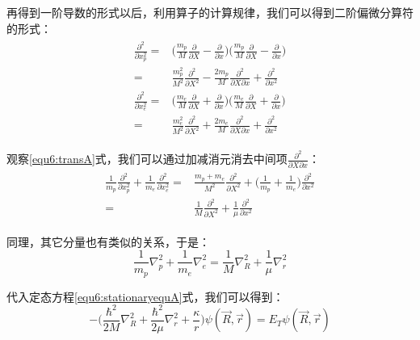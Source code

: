             再得到一阶导数的形式以后，利用算子的计算规律，我们可以得到二阶偏微分算符的形式：
            \begin{align}\label{equ6:transA}
                \begin{split}
                    \frac{\partial^2}{\partial x_p^2}=&\Big(\frac{m_p}{M}\frac{\partial }{\partial X}-\frac{\partial}{\partial x}\Big)\Big(\frac{m_p}{M}\frac{\partial }{\partial X}-\frac{\partial}{\partial x}\Big)\\
                    =&\frac{m_p^2}{M^2}\frac{\partial^2}{\partial X^2}-\frac{2m_p}{M}\frac{\partial^2}{\partial X\partial x}+\frac{\partial^2}{\partial x^2}\\
                    \frac{\partial^2}{\partial x_e^2}=&\Big(\frac{m_e}{M}\frac{\partial }{\partial X}+\frac{\partial}{\partial x}\Big)\Big(\frac{m_e}{M}\frac{\partial }{\partial X}+\frac{\partial}{\partial x}\Big)\\
                    =&\frac{m_e^2}{M^2}\frac{\partial^2}{\partial X^2}+\frac{2m_e}{M}\frac{\partial^2}{\partial X\partial x}+\frac{\partial^2}{\partial x^2}
                \end{split}
            \end{align}
            
            观察\ref{equ6:transA}式，我们可以通过加减消元消去中间项$\frac{\partial^2}{\partial X\partial x}$：
            \begin{align}
                \begin{split}
                    \frac{1}{m_p}\frac{\partial^2}{\partial x_p^2}+\frac{1}{m_e}\frac{\partial^2}{\partial x_e^2}=& \frac{m_p+m_e}{M^2}\frac{\partial^2}{\partial X^2}+\Big(\frac{1}{m_p}+\frac{1}{m_e}\Big)\frac{\partial^2}{\partial x^2}\\
                    =&\frac{1}{M}\frac{\partial^2}{\partial X^2}+\frac{1}{\mu}\frac{\partial^2}{\partial x^2}
                \end{split}
            \end{align}
            
            同理，其它分量也有类似的关系，于是：
            \begin{equation}
                \frac{1}{m_p}\nabla_p^2+\frac{1}{m_e}\nabla_e^2=\frac{1}{M}\nabla_R^2+\frac{1}{\mu}\nabla_r^2
            \end{equation}
            
            代入定态方程\ref{equ6:stationaryequA}式，我们可以得到：
            \begin{equation}
                -\Big(\frac{\hbar^2}{2M}\nabla_R^2+\frac{\hbar^2}{2\mu}\nabla_r^2+\frac{\kappa}{r}\Big)\psi(\vec{R},\vec{r})=E_T\psi(\vec{R},\vec{r})
            \end{equation}
            
